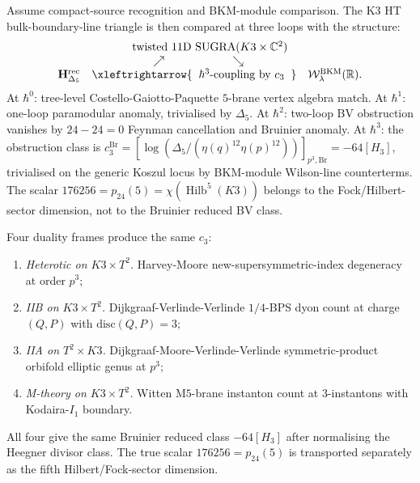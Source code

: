 \begin{remark}
\label{rem:htbb-synthesis}

Assume compact-source recognition and BKM-module comparison. The K3 HT
bulk-boundary-line triangle is then compared at three loops with the
structure:
\[
\begin{array}{c}
 \text{twisted 11D SUGRA}(K3\times\mathbb{C}^2) \\
 \hspace{-2em}\nearrow\qquad\qquad\qquad\searrow \\
 \mathbf{H}_{\Delta_5}^{\mathrm{rec}}
 \quad\xleftrightarrow{\;\;\hbar^3\text{-coupling by }c_3\;\;}\quad
 \mathcal{W}^{\mathrm{BKM}}_\lambda(\mathbb{R}).
\end{array}
\]
At $\hbar^0$: tree-level Costello-Gaiotto-Paquette $5$-brane vertex
algebra match. At $\hbar^1$: one-loop paramodular anomaly,
trivialised by $\Delta_5$. At $\hbar^2$: two-loop BV obstruction
vanishes by $24 - 24 = 0$ Feynman cancellation and Bruinier anomaly.
At $\hbar^3$: the obstruction class is
	$c^{\mathrm{Br}}_3
		=[\log(\Delta_5/(\eta(q)^{12}\eta(p)^{12}))]_{p^3,\mathrm{Br}}
	=-64[H_3]$, trivialised on the generic Koszul locus by BKM-module
Wilson-line counterterms. The scalar
$176256=p_{24}(5)=\chi(\operatorname{Hilb}^5(K3))$ belongs to the
Fock/Hilbert-sector dimension, not to the Bruinier reduced BV class.

Four duality frames produce the same $c_3$:
\begin{enumerate}[leftmargin=1.8em,label=\textup{(\alph*)}]
\item \emph{Heterotic on $K3\times T^2$.} Harvey-Moore
 new-supersymmetric-index degeneracy at order $p^3$;
\item \emph{IIB on $K3\times T^2$.} Dijkgraaf-Verlinde-Verlinde
 $1/4$-BPS dyon count at charge $(Q, P)$ with
 $\mathrm{disc}(Q, P) = 3$;
\item \emph{IIA on $T^2\times K3$.} Dijkgraaf-Moore-Verlinde-Verlinde
 symmetric-product orbifold elliptic genus at $p^3$;
\item \emph{M-theory on $K3\times T^2$.} Witten M$5$-brane instanton
 count at 3-instantons with Kodaira-$I_1$ boundary.
\end{enumerate}
All four give the same Bruinier reduced class \(-64[H_3]\) after
normalising the Heegner divisor class. The true scalar
$176256=p_{24}(5)$ is transported separately as the fifth
Hilbert/Fock-sector dimension.
\end{remark}


